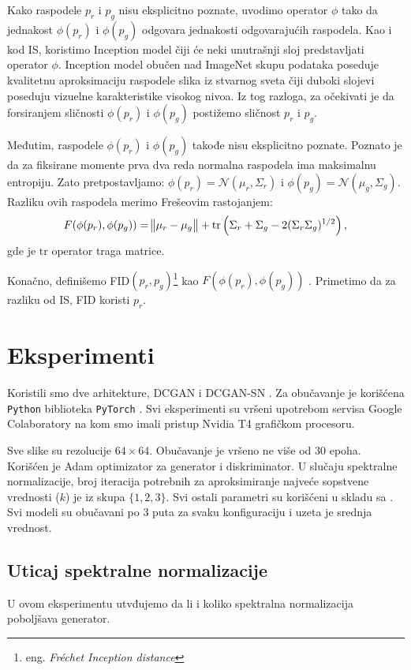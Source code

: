 \documentclass[12pt, a4paper]{article}
\begin{document}
Kako raspodele $p_r$ i $p_g$ nisu eksplicitno poznate, uvodimo operator $\phi$ tako da jednakost $\phi(p_r)$ i $\phi(p_g)$ odgovara jednakosti odgovarajućih raspodela. Kao i kod IS, koristimo Inception model čiji će neki unutrašnji sloj predstavljati operator $\phi$. Inception model obučen nad ImageNet skupu podataka poseduje kvalitetnu aproksimaciju raspodele slika iz stvarnog sveta čiji duboki slojevi poseduju vizuelne karakteristike visokog nivoa. Iz tog razloga, za očekivati je da forsiranjem sličnosti $\phi(p_r)$ i $\phi(p_g)$ postižemo sličnost $p_r$ i $p_g$.

Međutim, raspodele $\phi(p_r)$ i $\phi(p_g)$ takođe nisu eksplicitno poznate. Poznato je da za fiksirane momente prva dva reda normalna raspodela ima maksimalnu entropiju. Zato pretpostavljamo: $\phi(p_r) = \mathcal{N}(\mu_r, \Sigma_r)$ i $\phi(p_g) = \mathcal{N}(\mu_g, \Sigma_g).$ Razliku ovih raspodela merimo Frešeovim rastojanjem:
\begin{equation}
F(\phi(p_r), \phi(p_g)) = \norm{\mu_r - \mu_g} + \text{tr}\left(\Sigma_r + \Sigma_g - 2(\Sigma_r \Sigma_g)^{1/2}\right),
\end{equation}
gde je $\text{tr}$ operator traga matrice.

Konačno, definišemo FID$(p_r, p_g)$\footnote{eng. \textit{Fréchet Inception distance}} kao $F(\phi(p_r), \phi(p_g))$ \cite{FID-2017}. Primetimo da za razliku od IS, FID koristi $p_r$.

\section{Eksperimenti}
Koristili smo dve arhitekture, DCGAN \cite{DCGAN-2016} i DCGAN-SN \cite{SN-2018}. Za obučavanje je korišćena \texttt{Python} biblioteka \texttt{PyTorch} \cite{PyTorch-2019}. Svi eksperimenti su vršeni upotrebom servisa Google Colaboratory na kom smo imali pristup Nvidia T4 grafičkom procesoru.

Sve slike su rezolucije $64 \times 64$. Obučavanje je vršeno ne više od 30 epoha. Korišćen je Adam optimizator za generator i diskriminator. U slučaju spektralne normalizacije, broj iteracija potrebnih za aproksimiranje najveće sopstvene vrednosti ($k$) je iz skupa $\{1, 2, 3\}$. Svi ostali parametri su korišćeni u skladu sa \cite{DCGAN-2016}. Svi modeli su obučavani po $3$ puta za svaku konfiguraciju i uzeta je srednja vrednost.

\subsection{Uticaj spektralne normalizacije}
U ovom eksperimentu utvđujemo da li i koliko spektralna normalizacija poboljšava generator.
\end{document}
